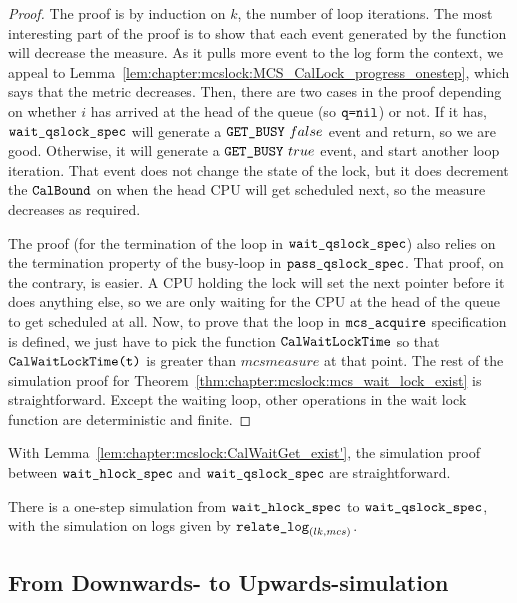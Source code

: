 \begin{proof}
The proof is by induction on $k$, the number of loop iterations. The
most interesting part of the proof is to show that each event
generated by the function will decrease the measure.
As it pulls more event to the log form the context, we appeal to
Lemma~\ref{lem:chapter:mcslock:MCS_CalLock_progress_onestep}, which says that the metric decreases. 
Then, there are two cases in the proof depending on whether $i$ has
arrived at the head of the queue (so ${\mathrm{\texttt{q=}}}{\mathrm{\texttt{nil}}}$) or not. If it has,
${\mathrm{\texttt{wait\_qslock\_spec}}}$ will generate a ${\mathrm{\texttt{GET\_BUSY}}}~{false}$
event and return, so we are good. 
Otherwise, it will generate a ${\mathrm{\texttt{GET\_BUSY}}}~{true}$ event, and
start another loop iteration. That event does not change the state of
the lock, but it does decrement the ${\mathrm{\texttt{CalBound}}}$ on when the head CPU
will get scheduled next, so the measure decreases as required.

The proof (for the termination of the loop in ${\mathrm{\texttt{wait\_qslock\_spec}}}$) also relies on the termination property of the busy-loop in ${\mathrm{\texttt{pass\_qslock\_spec}}}$.
That proof, on the contrary, is easier. A CPU holding the lock will set
the next pointer before it does anything else, so we are only waiting
for the CPU at the head of the queue to get scheduled at all.
Now, to prove that the loop in ${\mathrm{\texttt{mcs\_acquire}}}$ specification
is defined, we just have to pick the function ${\mathrm{\texttt{CalWaitLockTime}}}$
so that ${\mathrm{\texttt{CalWaitLockTime}}}{\mathrm{\texttt{(t)}}}$ is greater than $mcsmeasure$ at that
point. The rest of the simulation proof for Theorem~\ref{thm:chapter:mcslock:mcs_wait_lock_exist} is straightforward.
Except the waiting loop, other operations in the wait lock function are deterministic and finite. 
\end{proof}

With Lemma~\ref{lem:chapter:mcslock:CalWaitGet_exist'}, 
the simulation proof between ${\mathrm{\texttt{wait\_hlock\_spec}}}$ and ${\mathrm{\texttt{wait\_qslock\_spec}}}$ are straightforward.
\begin{theorem}
There is a one-step simulation from ${\mathrm{\texttt{wait\_hlock\_spec}}}$ to
${\mathrm{\texttt{wait\_qslock\_spec}}}$, with the simulation on logs given by ${\mathrm{\texttt{relate\_log}}}_{(lk, mcs)}$.
\end{theorem}


\subsection{From Downwards- to Upwards-simulation}
\label{chapter:mcslock:sec:downwards-to-upwards}

